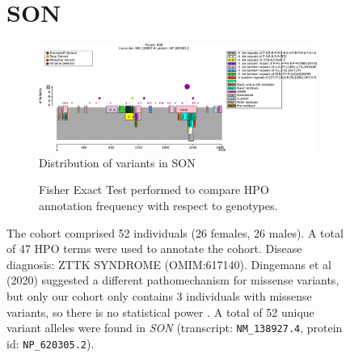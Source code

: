 \begin{figure}[htbp]
\section*{SON}
\centering
\begin{subfigure}[b]{0.95\textwidth}
\centering
\includegraphics[width=\textwidth]{img/SON_protein_diagram.pdf} 
\captionsetup{justification=raggedright,singlelinecheck=false}
\caption{Distribution of variants in SON}
\end{subfigure}

\vspace{2em}

\begin{subfigure}[b]{0.95\textwidth}
\centering
{}
\captionsetup{justification=raggedright,singlelinecheck=false}
\caption{Fisher Exact Test performed to compare HPO annotation frequency with respect to genotypes.}
\end{subfigure}

\vspace{2em}

\caption{ The cohort comprised 52 individuals (26 females, 26 males). A total of 47 HPO terms were used to annotate the cohort. 
Disease diagnosis: ZTTK SYNDROME (OMIM:617140). Dingemans et al (2020) suggested a different pathomechanism for missense variants, 
but only our cohort only contains 3 individuals with missense variants, so there is no statistical power \cite{PMID_34521999}. 
A total of 52 unique variant alleles were found in \textit{SON} (transcript: \texttt{NM\_138927.4}, protein id: \texttt{NP\_620305.2}).}
\end{figure}
